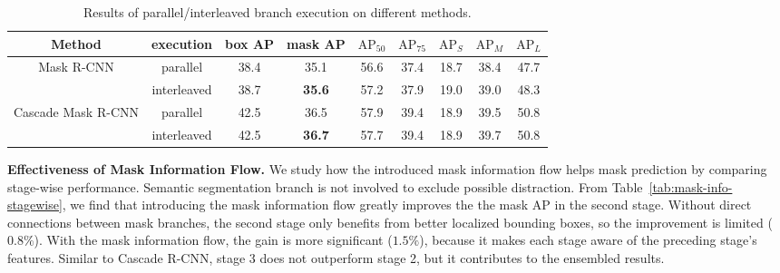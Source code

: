 \documentclass[10pt,twocolumn,letterpaper]{article}
\begin{document}
\begin{table*}[htb]
	\centering
	\caption{Results of parallel/interleaved branch execution on different methods.}
	\begin{tabular}{*{9}{c}}
		\toprule
		Method                              & execution   & box AP & mask AP & $\text{AP}_{50}$ & $\text{AP}_{75}$ & $\text{AP}_{S}$ & $\text{AP}_{M}$ & $\text{AP}_{L}$ \\
		\midrule
		\multirow{2}{*}{Mask R-CNN}         & parallel    &   38.4   &  35.1  &  56.6   &       37.4       &     18.7         &    38.4         &       47.7                      \\
		                                    & interleaved &   38.7 &   \textbf{35.6}  &     57.2         &       37.9        &    19.0        &      39.0       &      48.3       \\
		\midrule
		\multirow{2}{*}{Cascade Mask R-CNN} & parallel    &  42.5  &  36.5   &       57.9       &    39.4          &     18.9        &     39.5       &     50.8    \\
		                                    & interleaved &  42.5  &  \textbf{36.7}   &       57.7       &    39.4          &      18.9      &      39.7       &       50.8      \\
		\bottomrule
	\end{tabular}
	\label{tab:interleaved}
\end{table*}

\noindent\textbf{Effectiveness of Mask Information Flow.}
We study how the introduced mask information flow helps mask prediction by
comparing stage-wise performance.
Semantic segmentation branch is not involved to exclude possible distraction.
From Table~\ref{tab:mask-info-stagewise}, we find that introducing the mask
information flow greatly improves the the mask AP in the second stage.
Without direct connections between mask branches, the second stage only benefits
from better localized bounding boxes, so the improvement is limited ($0.8\%$).
With the mask information flow, the gain is more significant ($1.5\%$),
because it makes each stage aware of the preceding stage's features.
Similar to Cascade R-CNN, stage 3 does not outperform stage 2, but it
contributes to the ensembled results.
\end{document}
